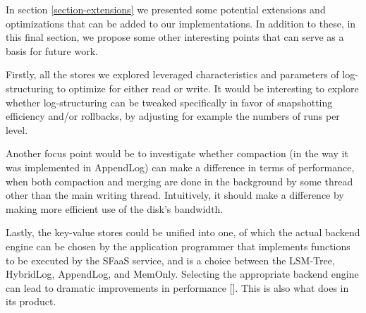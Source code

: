 In section \ref{section-extensions} we presented some potential extensions and optimizations that can be added to our implementations.  In addition to these, in this final section, we propose some other interesting points that can serve as a basis for future work.

Firstly, all the stores we explored leveraged characteristics and parameters of log-structuring to optimize for either read or write. It would be interesting to explore whether log-structuring can be tweaked specifically in favor of snapshotting efficiency and/or rollbacks, by adjusting for example the numbers of runs per level.

Another focus point would be to investigate whether compaction (in the way it was implemented in AppendLog) can make a difference in terms of performance, when both compaction and merging are done in the background by some thread other than the main writing thread. Intuitively, it should make a difference by making more efficient use of the disk's bandwidth.

Lastly, the key-value stores could be unified into one, of which the actual backend engine can be chosen by the application programmer that implements functions to be executed by the SFaaS service, and is a choice between the LSM-Tree, HybridLog, AppendLog, and MemOnly. Selecting the appropriate backend engine can lead to dramatic improvements in performance [\cite{workload-aware-streaming-state-management}]. This is also what \cite{riak} does in its product.
